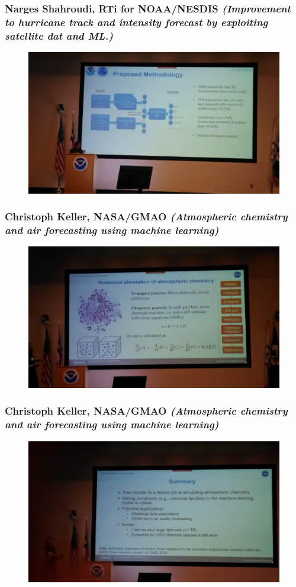 \documentclass{beamer}
\begin{document}
\begin{frame}
\frametitle{Narges Shahroudi, RTi for NOAA/NESDIS \textit{(Improvement to hurricane track and intensity forecast by exploiting satellite dat and ML.)}}
\begin{figure}
	\includegraphics[width=.9\linewidth]{figs/P_20190424_143519.jpg}
\end{figure}
\end{frame}

\begin{frame}
\frametitle{Christoph Keller, NASA/GMAO \textit{(Atmospheric chemistry and air forecasting using machine learning)}}
\begin{figure}
	\includegraphics[width=.9\linewidth]{figs/P_20190425_085723.jpg}
\end{figure}
\end{frame}


\begin{frame}
\frametitle{Christoph Keller, NASA/GMAO \textit{(Atmospheric chemistry and air forecasting using machine learning)}}
\begin{figure}
	\includegraphics[width=.9\linewidth]{figs/P_20190425_090846.jpg}
\end{figure}
\end{frame}
\end{document}
